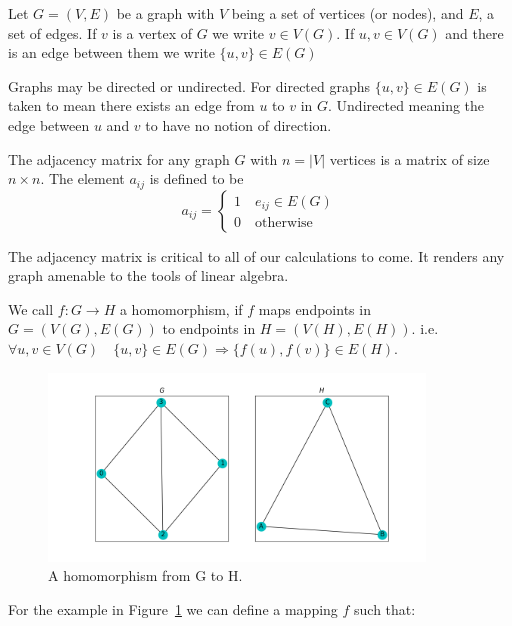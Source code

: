 \begin{dfn}
    Let $G = (V,E)$ be a graph with $V$ being a set of vertices (or nodes), 
and $E$, a set of edges. If $v$ is a vertex of $G$ we write $v \in V(G)$.
If $u,v \in V(G)$ and there is an edge between them we 
write $\{u,v\} \in E(G)$
\end{dfn}

Graphs may be directed or undirected. For directed graphs $\{u,v\} \in E(G)$
is taken to mean there exists an edge from $u$ to $v$ in $G$. Undirected meaning the 
edge between $u$ and $v$ to have no notion of direction.

\begin{dfn}
    The adjacency matrix for any graph $G$ with $n=|V|$ vertices is a matrix of size
    $n \times n$. The element $a_{ij}$ is defined to be
    $$
    a_{ij} = 
    \begin{cases}
        1 \quad e_{ij} \in E(G)\\
        0 \quad \text{otherwise}
    \end{cases}
    $$
    \label{def:adjmat}
\end{dfn}

\noindent The adjacency matrix is critical to all of our calculations to come. It renders
any graph amenable to the tools of linear algebra.

\begin{dfn}
\label{def:homomorphism}
We call $f: G \rightarrow H$ a homomorphism,
if $f$ maps endpoints in $G=(V(G),E(G))$ to endpoints in $H=(V(H),E(H))$.
i.e. $ \forall u,v \in V(G) \quad \{u,v\} \in E(G) \Rightarrow \{f(u),
f(v)\} \in E(H)$.
\end{dfn}

\begin{figure}[h!]
    \includegraphics[width=10cm]{Images/graph_homomorphism.png}
    \centering
    \caption{A homomorphism from G to H.}
    \label{fig:homomorphism}
\end{figure}

\noindent  For the example in Figure~\ref{fig:homomorphism} we can define a mapping $f$ such that:


